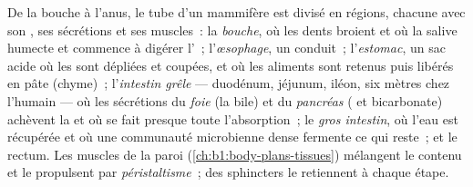 \begin{proposition}\label{prop:b1:digestion-absorption:tract}
De la bouche à l'anus, le tube d'un mammifère est divisé en régions,
chacune avec son , ses sécrétions et ses muscles~: la
\emph{bouche}, où les dents broient et où la salive humecte et commence
à digérer l'~; l'\emph{œsophage}, un conduit~; l'\emph{estomac},
un sac acide où les  sont dépliées et coupées, et où les
aliments sont retenus puis libérés en pâte (chyme)~; l'\emph{intestin
grêle} --- duodénum, jéjunum, iléon, six mètres chez l'humain --- où les
sécrétions du \emph{foie} (la bile) et du \emph{pancréas} ( et
bicarbonate) achèvent la  et où se fait presque toute
l'absorption~; le \emph{gros intestin}, où l'eau est récupérée et où une
communauté microbienne dense fermente ce qui reste~; et le rectum. Les
muscles de la paroi (\cref{ch:b1:body-plans-tissues}) mélangent le
contenu et le propulsent par \emph{péristaltisme}~; des sphincters le
retiennent à chaque étape.
\end{proposition}

